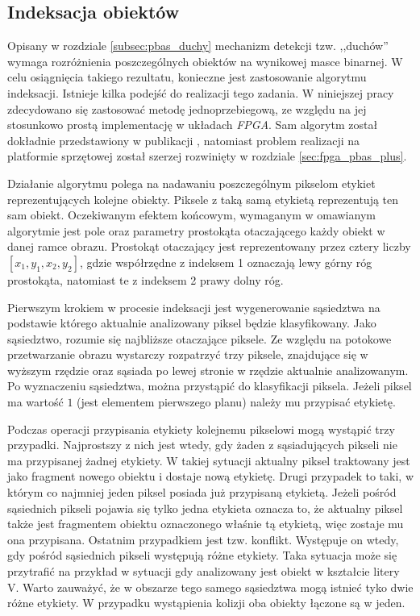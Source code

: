 

\subsection{Indeksacja obiektów}
\label{subsec:pbas_indeksacja}

Opisany w rozdziale \ref{subsec:pbas_duchy} mechanizm detekcji tzw. ,,duchów'' wymaga rozróżnienia poszczególnych obiektów na wynikowej masce binarnej. 
W celu osiągnięcia takiego rezultatu, konieczne jest zastosowanie algorytmu indeksacji. 
Istnieje kilka podejść do realizacji tego zadania. 
W niniejszej pracy zdecydowano się zastosować metodę jednoprzebiegową, ze względu na jej stosunkowo prostą implementację w układach \textit{FPGA}. Sam algorytm został dokładnie przedstawiony w publikacji \cite{kryjak_14_pbas}, natomiast problem realizacji na platformie sprzętowej został szerzej rozwinięty w rozdziale \ref{sec:fpga_pbas_plus}. %

Działanie algorytmu polega na nadawaniu poszczególnym pikselom etykiet reprezentujących kolejne obiekty. 
Piksele z taką samą etykietą reprezentują ten sam obiekt. 
Oczekiwanym efektem końcowym, wymaganym w omawianym algorytmie jest pole oraz parametry prostokąta otaczającego każdy obiekt w danej ramce obrazu.
Prostokąt otaczający jest reprezentowany przez cztery liczby $[x_1,y_1,x_2,y_2]$, gdzie współrzędne z indeksem 1 oznaczają lewy górny róg prostokąta, natomiast te z indeksem 2 prawy dolny róg. 

Pierwszym krokiem w procesie indeksacji jest wygenerowanie sąsiedztwa na podstawie którego aktualnie analizowany piksel będzie klasyfikowany. 
Jako sąsiedztwo, rozumie się najbliższe otaczające piksele. 
Ze względu na potokowe przetwarzanie obrazu wystarczy rozpatrzyć trzy piksele, znajdujące się w wyższym rzędzie oraz sąsiada po lewej stronie w rzędzie aktualnie analizowanym. 
Po wyznaczeniu sąsiedztwa, można przystąpić do klasyfikacji piksela. 
Jeżeli piksel ma wartość $1$ (jest elementem pierwszego planu) należy mu przypisać etykietę.  

Podczas operacji przypisania etykiety kolejnemu pikselowi mogą wystąpić trzy przypadki. 
Najprostszy z nich jest wtedy, gdy żaden z sąsiadujących pikseli nie ma przypisanej żadnej etykiety. 
W takiej sytuacji aktualny piksel traktowany jest jako fragment nowego obiektu i dostaje nową etykietę. 
Drugi przypadek to taki, w którym co najmniej jeden piksel posiada już przypisaną etykietą. 
Jeżeli pośród sąsiednich pikseli pojawia się tylko jedna etykieta oznacza to, że aktualny piksel także jest fragmentem obiektu oznaczonego właśnie tą etykietą, więc zostaje mu ona przypisana.
Ostatnim przypadkiem jest tzw. konflikt. 
Występuje on wtedy, gdy pośród sąsiednich pikseli występują różne etykiety. 
Taka sytuacja może się przytrafić na przykład w sytuacji gdy analizowany jest obiekt w kształcie litery V. 
Warto zauważyć, że w obszarze tego samego sąsiedztwa mogą istnieć tyko dwie różne etykiety. 
W przypadku wystąpienia kolizji oba obiekty łączone są w jeden.

